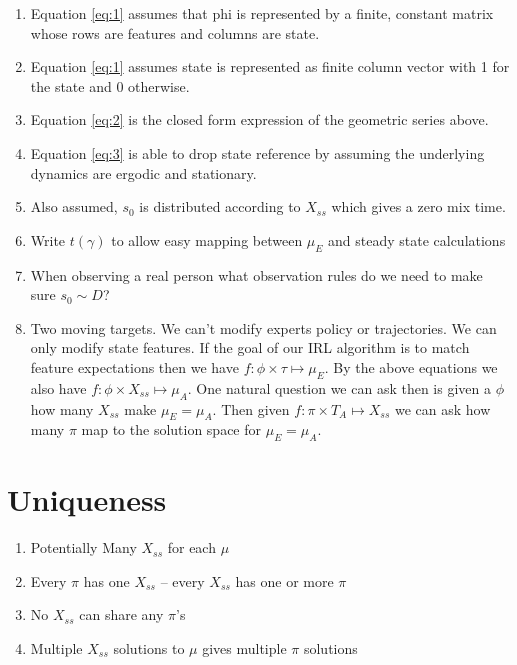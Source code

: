 \documentclass[12pt]{article}
\begin{document}
		\begin{enumerate}
			\item Equation \ref{eq:1} assumes that phi is represented by a finite, constant matrix whose rows are features and columns are state. 
			\item Equation \ref{eq:1} assumes state is represented as finite column vector with 1 for the state and 0 otherwise.
			\item Equation \ref{eq:2} is the closed form expression of the geometric series above.
			\item Equation \ref{eq:3} is able to drop state reference by assuming the underlying dynamics are ergodic and stationary. 
			\item Also assumed, $s_0$ is distributed according to $X_{ss}$ which gives a zero mix time.			
			\item Write $t(\gamma)$ to allow easy mapping between $\mu_E$ and steady state calculations			
			\item When observing a real person what observation rules do we need to make sure $s_0 \sim D$?
			\item Two moving targets. We can't modify experts policy or trajectories. We can only modify state features. If the goal of our IRL algorithm is to match feature expectations then we have $f:\phi \times \tau \mapsto \mu_E$. By the above equations we also have $f:\phi \times X_{ss} \mapsto \mu_A$. One natural question we can ask then is given a $\phi$ how many $X_{ss}$ make $\mu_E = \mu_A$. Then given $f:\pi \times T_A \mapsto X_{ss}$ we can ask how many $\pi$ map to the solution space for $\mu_E = \mu_A$.    
		\end{enumerate}

	\section{Uniqueness}
		\begin{enumerate}
			\item Potentially Many $X_{ss}$ for each $\mu$
			\item Every $\pi$ has one $X_{ss}$ -- every $X_{ss}$ has one or more $\pi$
			\item No $X_{ss}$ can share any $\pi$'s
			\item Multiple $X_{ss}$ solutions to $\mu$ gives multiple $\pi$ solutions
		\end{enumerate}
\end{document}
